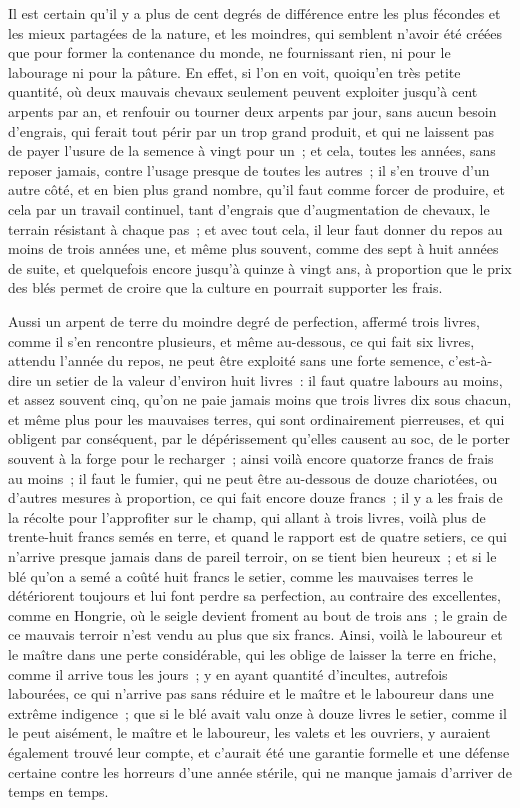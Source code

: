 \documentclass[french,twoside]{book} %
\begin{document}
Il est certain qu’il y a plus de cent degrés de différence entre les plus fécondes et les mieux partagées de la nature, et les moindres, qui semblent n’avoir été créées que pour former la contenance du monde, ne fournissant rien, ni pour le labourage ni pour la pâture. En effet, si l’on en voit, quoiqu’en très petite quantité, où deux mauvais chevaux seulement peuvent exploiter jusqu’à cent arpents par an, et renfouir ou tourner deux arpents par jour, sans aucun besoin d’engrais, qui ferait tout périr par un trop grand produit, et qui ne laissent pas de payer l’usure de la semence à vingt pour un ; et cela, toutes les années, sans reposer jamais, contre l’usage presque de toutes les autres ; il s’en trouve d’un autre côté, et en bien plus grand nombre, qu’il faut comme forcer de produire, et cela par un travail continuel, tant d’engrais que d’augmentation de chevaux, le terrain résistant à chaque pas ; et avec tout cela, il leur faut donner du repos au moins de trois années une, et même plus souvent, comme des sept à huit années de suite, et quelquefois encore jusqu’à quinze à vingt ans, à proportion que le prix des blés permet de croire que la culture en pourrait supporter les frais.\par
Aussi un arpent de terre du moindre degré de perfection, affermé trois livres, comme il s’en rencontre plusieurs, et même au-dessous, ce qui fait six livres, attendu l’année du repos, ne peut être exploité sans une forte semence, c’est-à-dire un setier de la valeur d’environ huit livres : il faut quatre labours au moins, et assez souvent cinq, qu’on ne paie jamais moins que trois livres dix sous chacun, et même plus pour les mauvaises terres, qui sont ordinairement pierreuses, et qui obligent par conséquent, par le dépérissement qu’elles causent au soc, de le porter souvent à la forge pour le recharger ; ainsi voilà encore quatorze francs de frais au moins ; il faut le fumier, qui ne peut être au-dessous de douze chariotées, ou d’autres mesures à proportion, ce qui fait encore douze francs ; il y a les frais de la récolte pour l’approfiter sur le champ, qui allant à trois livres, voilà plus de trente-huit francs semés en terre, et quand le rapport est de quatre setiers, ce qui n’arrive presque jamais dans de pareil terroir, on se tient bien heureux ; et si le blé qu’on a semé a coûté huit francs le setier, comme les mauvaises terres le détériorent toujours et lui font perdre sa perfection, au contraire des excellentes, comme en Hongrie, où le seigle devient froment au bout de trois ans ; le grain de ce mauvais terroir n’est vendu au plus que six francs. Ainsi, voilà le laboureur et le maître dans une perte considérable, qui les oblige de laisser la terre en friche, comme il arrive tous les jours ; y en ayant quantité d’incultes, autrefois labourées, ce qui n’arrive pas sans réduire et le maître et le laboureur dans une extrême indigence ; que si le blé avait valu onze à douze livres le setier, comme il le peut aisément, le maître et le laboureur, les valets et les ouvriers, y auraient également trouvé leur compte, et c’aurait été une garantie formelle et une défense certaine contre les horreurs d’une année stérile, qui ne manque jamais d’arriver de temps en temps.\par
\end{document}
